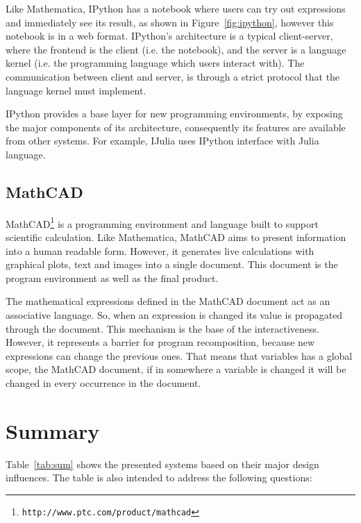 Like Mathematica, IPython has a notebook where users can try out expressions and immediately see its result, as shown in Figure~\ref{fig:ipython}, however this notebook is in a web format. IPython's architecture is a typical client-server, where the frontend is the client (i.e. the notebook), and the server is a language kernel (i.e. the programming language which users interact with). The communication between client and server, is through a strict protocol that the language kernel must implement. 

IPython provides a base layer for new programming environments, by exposing the major components of its architecture, consequently its features are available from other systems. For example, IJulia uses IPython interface with Julia language. 
\subsection{MathCAD}
\label{subsec:mathcad}
MathCAD\footnote{\texttt{http://www.ptc.com/product/mathcad}} is a programming environment and language built to support scientific calculation. Like Mathematica, MathCAD aims to present information into a human readable form. However, it generates live calculations with graphical plots, text and images into a single document. This document is the program environment as well as the final product.

The mathematical expressions defined in the MathCAD document act as an associative language. So, when an expression is changed its value is propagated through the document. This mechanism is the base of the interactiveness. However, it represents a barrier for program recomposition, because new expressions can change the previous ones. That means that variables has a global scope, the MathCAD document, if in somewhere a variable is changed it will be changed in every occurrence in the document.   
\section{Summary}

Table~\ref{tab:sum} shows the presented systems based on their major design influences. The table is also intended to address the following questions:

